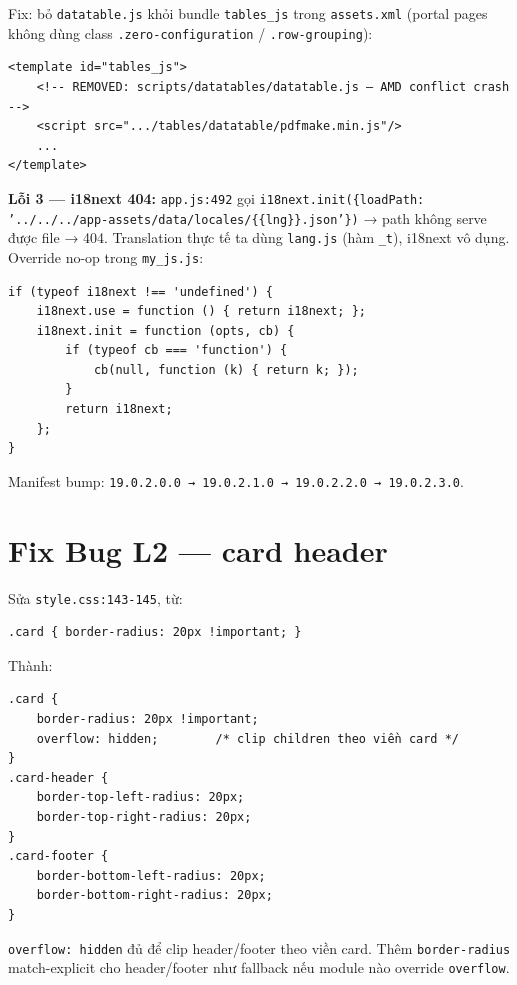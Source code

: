 Fix: bỏ \texttt{datatable.js} khỏi bundle \texttt{tables\_js} trong \texttt{assets.xml} (portal pages không dùng class \texttt{.zero-configuration} / \texttt{.row-grouping}):

\begin{lstlisting}[style=python]
<template id="tables_js">
    <!-- REMOVED: scripts/datatables/datatable.js — AMD conflict crash -->
    <script src=".../tables/datatable/pdfmake.min.js"/>
    ...
</template>
\end{lstlisting}

\textbf{Lỗi 3 --- i18next 404:} \texttt{app.js:492} gọi \texttt{i18next.init(\{loadPath: '../../../app-assets/data/locales/\{\{lng\}\}.json'\})} → path không serve được file → 404. Translation thực tế ta dùng \texttt{lang.js} (hàm \texttt{\_t}), i18next vô dụng. Override no-op trong \texttt{my\_js.js}:

\begin{lstlisting}[style=python]
if (typeof i18next !== 'undefined') {
    i18next.use = function () { return i18next; };
    i18next.init = function (opts, cb) {
        if (typeof cb === 'function') {
            cb(null, function (k) { return k; });
        }
        return i18next;
    };
}
\end{lstlisting}

Manifest bump: \texttt{19.0.2.0.0 → 19.0.2.1.0 → 19.0.2.2.0 → 19.0.2.3.0}.

\section{Fix Bug L2 --- card header}

Sửa \texttt{style.css:143-145}, từ:

\begin{lstlisting}[style=python]
.card { border-radius: 20px !important; }
\end{lstlisting}

Thành:

\begin{lstlisting}[style=python]
.card {
    border-radius: 20px !important;
    overflow: hidden;        /* clip children theo viền card */
}
.card-header {
    border-top-left-radius: 20px;
    border-top-right-radius: 20px;
}
.card-footer {
    border-bottom-left-radius: 20px;
    border-bottom-right-radius: 20px;
}
\end{lstlisting}

\texttt{overflow: hidden} đủ để clip header/footer theo viền card. Thêm \texttt{border-radius} match-explicit cho header/footer như fallback nếu module nào override \texttt{overflow}.

